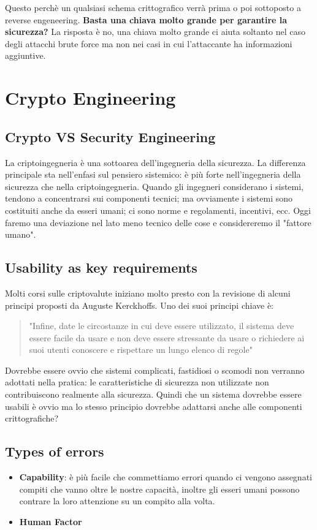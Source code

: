 \documentclass[11pt]{article}
\theoremstyle{definition} \newtheorem{definizione}{Definizione}[section] %
\begin{document}
    Questo perchè un qualsiasi schema crittografico verrà prima o poi sottoposto a reverse engeneering.
    \newline
    \textbf{Basta una chiava molto grande per garantire la sicurezza?} La risposta è no, una chiava molto grande ci aiuta soltanto nel caso degli attacchi brute force ma non nei casi in cui l'attaccante ha informazioni aggiuntive.

\section{Crypto Engineering}
    \subsection{Crypto VS Security Engineering}
    La criptoingegneria è una sottoarea dell'ingegneria della sicurezza. La differenza principale sta nell'enfasi sul pensiero sistemico: è più forte nell'ingegneria della sicurezza che nella criptoingegneria. Quando gli ingegneri considerano i sistemi, tendono a concentrarsi sui componenti tecnici; ma ovviamente i sistemi sono costituiti anche da esseri umani; ci sono norme e regolamenti, incentivi, ecc. Oggi faremo una deviazione nel lato meno tecnico delle cose e considereremo il "fattore umano".

    \subsection{Usability as key requirements}
    Molti corsi sulle criptovalute iniziano molto presto con la revisione di alcuni principi proposti da Auguste Kerckhoffs. 
    Uno dei suoi principi chiave è: 
    \begin{quote}
     "Infine, date le circostanze in cui deve essere utilizzato, il sistema deve essere facile da usare e non deve essere stressante da usare o richiedere ai suoi utenti conoscere e rispettare un lungo elenco di regole"
    \end{quote} 
    Dovrebbe essere ovvio che sistemi complicati, fastidiosi o scomodi non verranno adottati nella pratica: le caratteristiche di sicurezza non utilizzate non contribuiscono realmente alla sicurezza.
    \newline
    Quindi che un sistema dovrebbe essere usabili è ovvio ma lo stesso principio dovrebbe adattarsi anche alle componenti crittografiche?

    \subsection{Types of errors}
    \begin{itemize}
        \item \textbf{Capability}: è più facile che commettiamo errori quando ci vengono assegnati compiti che vanno oltre le nostre capacità, inoltre gli esseri umani possono contrare la loro attenzione su un compito alla volta.
        \item \textbf{Human Factor}
    \end{itemize}
\end{document}
